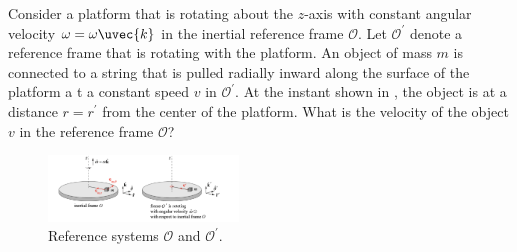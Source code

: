 \documentclass[../main.tex]{subfiles}
\begin{document}
\begin{problema}
	Consider a platform that is rotating about the \(z\)-axis with
	constant angular velocity \(\omega = \omega \uvec{k}\) in the
	inertial reference frame \(\mathcal{O}\). Let \(\mathcal{O}^{\prime}\)
	denote a reference frame that is rotating with the platform.
	An object of mass \(m\) is connected to a string that is pulled
	radially inward along the surface of the platform a t a
	constant speed \(v\) in \( \mathcal{O}^{\prime}\). At the instant
	shown in , the object is at a distance \(r = r^{\prime}\)
	from the center of the platform. What is the velocity of
	the object \(v\) in the reference frame \(\mathcal{O}\)?

	\begin{figure}[htb]
		\centering
		\includegraphics[width=0.45\textwidth]{figs/problema04.png}
		\caption{Reference systems \(\mathcal{O}\) and \(\mathcal{O}^{\prime}\).}
		\label{fig:problem04}
	\end{figure}
\end{problema}
\end{document}
